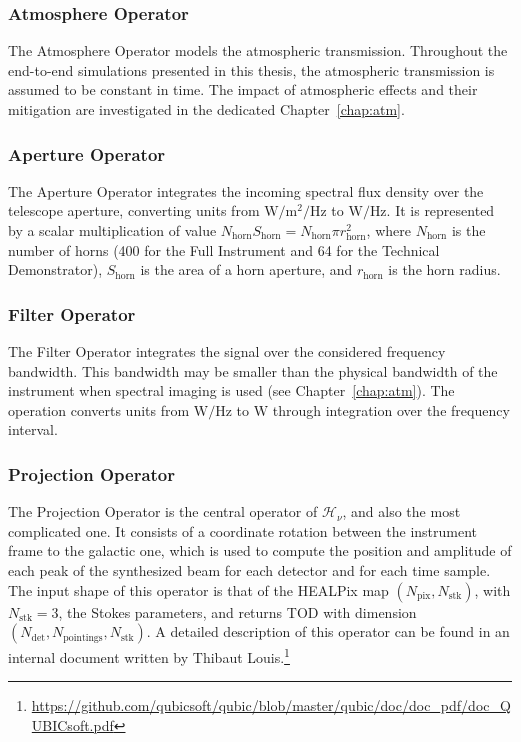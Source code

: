 \documentclass[../../thesis.tex]{subfiles}
\begin{document}
\subsubsection{Atmosphere Operator}

The Atmosphere Operator models the atmospheric transmission. Throughout the end-to-end simulations presented in this thesis, the atmospheric transmission is assumed to be constant in time. The impact of atmospheric effects and their mitigation are investigated in the dedicated Chapter~\ref{chap:atm}.

\subsubsection{Aperture Operator}

The Aperture Operator integrates the incoming spectral flux density over the telescope aperture, converting units from $\text{W}/\text{m}^2/\text{Hz}$ to $\text{W}/\text{Hz}$. It is represented by a scalar multiplication of value $N_{\text{horn}}S_{\text{horn}} = N_{\text{horn}}\pi r_{\text{horn}}^2$, where $N_{\text{horn}}$ is the number of horns (400 for the Full Instrument and 64 for the Technical Demonstrator), $S_{\mathrm{horn}}$ is the area of a horn aperture, and $r_{\mathrm{horn}}$ is the horn radius.

\subsubsection{Filter Operator}

The Filter Operator integrates the signal over the considered frequency bandwidth. This bandwidth may be smaller than the physical bandwidth of the instrument when spectral imaging is used (see Chapter~\ref{chap:atm}). The operation converts units from $\mathrm{W/Hz}$ to $\mathrm{W}$ through integration over the frequency interval.

\subsubsection{Projection Operator}

The Projection Operator is the central operator of $\mathcal{H}_{\nu}$, and also the most complicated one. It consists of a coordinate rotation between the instrument frame to the galactic one, which is used to compute the position and amplitude of each peak of the synthesized beam for each detector and for each time sample. The input shape of this operator is that of the HEALPix map $\left(N_{\text{pix}}, N_{\text{stk}}\right)$, with $N_{\text{stk}}=3$, the Stokes parameters, and returns TOD with dimension $\left(N_{\text{det}}, N_{\text{pointings}}, N_{\text{stk}}\right)$. A detailed description of this operator can be found in an internal document written by Thibaut Louis.\footnote{\url{https://github.com/qubicsoft/qubic/blob/master/qubic/doc/doc_pdf/doc_QUBICsoft.pdf}}
\end{document}
